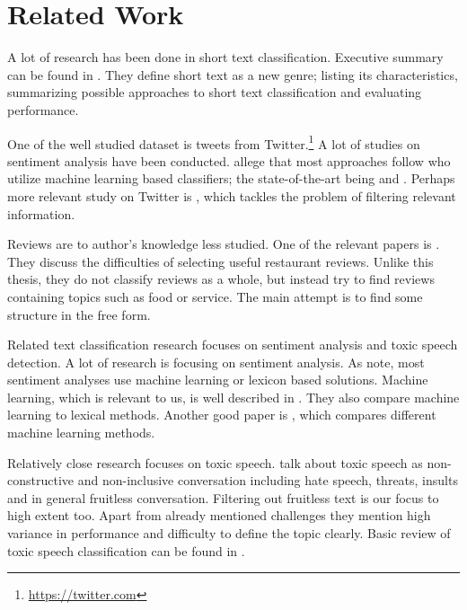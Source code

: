 \section{Related Work}

A lot of research has been done in short text classification.
Executive summary can be found in \citet{Song14}.
They define short text as a new genre; listing its characteristics, summarizing possible approaches to short text classification and evaluating performance.

One of the well studied dataset is tweets from Twitter.\footnote{\url{https://twitter.com}}
A lot of studies on sentiment analysis have been conducted.
\citet{jiang2011target} allege that most approaches follow
\citet{pang2002thumbs} who utilize machine learning based classifiers;
the state-of-the-art being \citet{go2009twitter} and \citet{barbosa2010robust}.
Perhaps more relevant study on Twitter is \citep{sriram2010short},
which tackles the problem of filtering relevant information.

Reviews are to author's knowledge less studied.
One of the relevant papers is \citet{ganu2009beyond}.
They discuss the difficulties of selecting useful restaurant reviews.
Unlike this thesis, they do not classify reviews as a whole, but instead try to find reviews containing topics such as food or service.
The main attempt is to find some structure in the free form.

Related text classification research focuses on sentiment analysis and toxic speech detection.
A lot of research is focusing on sentiment analysis.
As \citet{kaushik2014scalable} note, most sentiment analyses use machine learning or lexicon based solutions.
Machine learning, which is relevant to us, is well described in
\citet{melville2009sentiment}. They also compare machine learning to lexical methods.
Another good paper is \citet{xia2011ensemble}, which compares different machine learning methods.

Relatively close research focuses on toxic speech.
\citet{van2018challenges} talk about toxic speech as non-constructive and non-inclusive conversation including hate speech, threats, insults and in general fruitless conversation.
Filtering out fruitless text is our focus to high extent too.
Apart from already mentioned challenges they mention high variance in performance and difficulty to define the topic clearly.
Basic review of toxic speech classification can be found in \citet{gunasekara2018review}.
